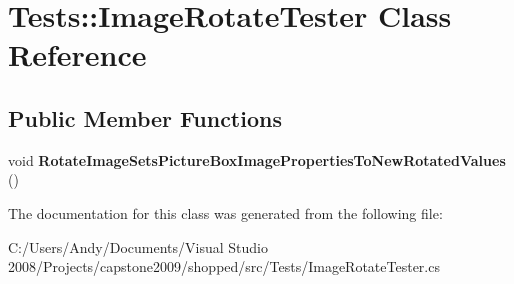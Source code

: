 \hypertarget{class_tests_1_1_image_rotate_tester}{
\section{Tests::ImageRotateTester Class Reference}
\label{class_tests_1_1_image_rotate_tester}
}
\subsection*{Public Member Functions}
\begin{DoxyCompactItemize}
\item 
\hypertarget{class_tests_1_1_image_rotate_tester_a57ad1def77297f660af2028aeef982c9}{
void {\bfseries RotateImageSetsPictureBoxImagePropertiesToNewRotatedValues} ()}
\label{class_tests_1_1_image_rotate_tester_a57ad1def77297f660af2028aeef982c9}

\end{DoxyCompactItemize}


The documentation for this class was generated from the following file:\begin{DoxyCompactItemize}
\item 
C:/Users/Andy/Documents/Visual Studio 2008/Projects/capstone2009/shopped/src/Tests/ImageRotateTester.cs\end{DoxyCompactItemize}
